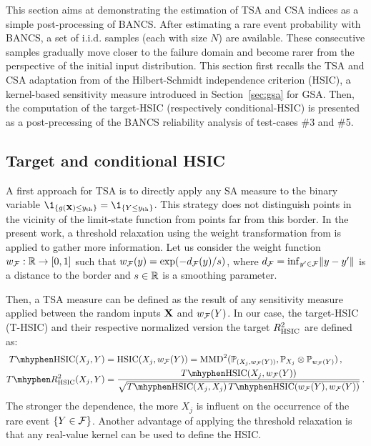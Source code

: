 This section aims at demonstrating the estimation of TSA and CSA indices as a simple post-processing of BANCS. 
After estimating a rare event probability with BANCS, a set of i.i.d. samples (each with size $N$) are available. 
These consecutive samples gradually move closer to the failure domain and become rarer from the perspective of the initial input distribution. 
This section first recalls the TSA and CSA adaptation from \citet{marrel_chabridon_2021} of the Hilbert-Schmidt independence criterion (HSIC), a kernel-based sensitivity measure introduced in Section~\ref{sec:gsa} for GSA.
Then, the computation of the target-HSIC (respectively conditional-HSIC) is presented as a post-precessing of the BANCS reliability analysis of test-cases \#3 and \#5. 


\subsection{Target and conditional HSIC}

A first approach for TSA is to directly apply any SA measure to the binary variable $\1_{\{g(\bX) \leq \yth\}} = \1_{\{Y \leq \yth\}}$. 
This strategy does not distinguish points in the vicinity of the limit-state function from points far from this border. 
In the present work, a threshold relaxation using the weight transformation from \citet{marrel_chabridon_2021} is applied to gather more information. 
Let us consider the weight function $w_{\mathcal{F}}: \mathbb{R} \rightarrow [0, 1]$ such that $w_{\mathcal{F}}(y) = \exp(-d_{\mathcal{F}}(y)/s)$, where $d_{\mathcal{F}} = \mathrm{inf}_{y'\in \mathcal{F}} \Vert y -y' \Vert$ is a distance to the border and $s\in\mathbb{R}$ is a smoothing parameter. 

Then, a TSA measure can be defined as the result of any sensitivity measure applied between the random inputs ${\bf X}$ and $w_{\mathcal{F}}(Y)$. 
In our case, the target-HSIC (T-HSIC) and their respective normalized version the target $R^2_{\mathrm{HSIC}}$ are defined as: 
\begin{subequations}
    \begin{align}
        T \mhyphen \HSIC(X_j, Y) & = \HSIC(X_j, w_{\iF}(Y)) = \MMD^2(\P_{(X_j, w_{\iF}(Y))}, \P_{X_j} \otimes \P_{w_{\iF}(Y)})\, ,\\
        T \mhyphen R^2_{\HSIC}(X_j, Y) &= \frac{T \mhyphen \HSIC(X_j, w_{\iF}(Y))}{\sqrt{T \mhyphen \HSIC(X_j, X_j) \, T \mhyphen \HSIC(w_{\iF}(Y), w_{\iF}(Y))}}\, .
    \end{align}
\end{subequations}
The stronger the dependence, the more $X_j$ is influent on the occurrence of the rare event $\{Y\in\mathcal{F}\}$.  
Another advantage of applying the threshold relaxation is that any real-value kernel can be used to define the HSIC. 


